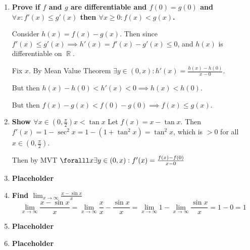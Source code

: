 \documentclass[10pt,a4paper]{article}
\DeclareMathOperator*{\R}{\mathbb{R}}
\begin{document}
\begin{enumerate}
    \item \textbf{Prove if $f$ and $g$ are differentiable and $f(0)=g(0)$ and $\forall x : f'(x) \leq g'(x)$ then $\forall x \geq 0 : f(x) < g(x)$.}

        Consider $h(x) = f(x) -g(x)$. Then since $f'(x) \leq g'(x) \implies  h'(x) = f'(x) - g'(x) \leq 0$, and $h(x)$ is differentiable on $\R$. 

        Fix $x$. By Mean Value Theorem $\exists y \in (0, x): h'(x) = \frac{h(x) - h(0)}{x-0}$. 

        But then $ h(x)- h(0) < h'(x) < 0 \implies h(x) < h(0)$.

        But then $f(x) - g(x)  < f(0) - g(0) \implies f(x) \leq g(x)$.

    \item \textbf{Show $\forall x \in (0, \frac{\pi}{2}) x < \tan x $}
        Let $f(x) = x - \tan x$. Then $f'(x) = 1 - \sec^2 x = 1 - (1 + \tan^2 x) = \tan^2 x$, which is $>0$ for all $x \in (0, \frac{\pi}{2})$.

        Then by MVT $\foralll x \exists y \in (0, x): f'(x) = \frac{f(x) - f(0)}{x-0}$

    \item \textbf{Placeholder}
    \item \textbf{Find $\lim_{x \to \infty} \frac{x - \sin x}{x}$}
        $$\lim_{x \to \infty} \frac{x - \sin x}{x} = \lim _{x \to \infty} \frac{x}{x} - \frac{\sin x}{x} = \lim_{x \to \infty} 1 - \lim_{x \to \infty} \frac{\sin x}{x} = 1 - 0 = 1$$
    \item \textbf{Placeholder}
    \item \textbf{Placeholder}

\end{enumerate}
\end{document}
